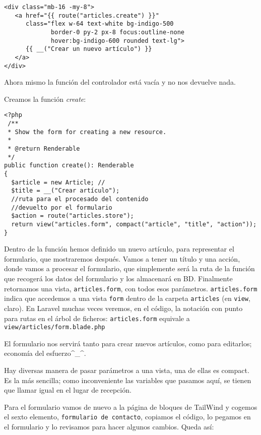 \documentclass[11pt]{article}
\begin{document}
\begin{verbatim}
<div class="mb-16 -my-8">
   <a href="{{ route("articles.create") }}"
      class="flex w-64 text-white bg-indigo-500
             border-0 py-2 px-8 focus:outline-none
             hover:bg-indigo-600 rounded text-lg">
      {{ __("Crear un nuevo artículo") }}
   </a>
</div>
\end{verbatim}
Ahora mismo la función del controlador está vacía y no nos devuelve nada.

Creamos la función \emph{create}:

\begin{verbatim}
<?php
 /**
 * Show the form for creating a new resource.
 *
 * @return Renderable
 */
public function create(): Renderable
{
  $article = new Article; //
  $title = __("Crear artículo");
  //ruta para el procesado del contenido
  //devuelto por el formulario
  $action = route("articles.store");
  return view("articles.form", compact("article", "title", "action"));
}
\end{verbatim}

Dentro de la función hemos definido un nuevo artículo, para
representar el formulario, que mostraremos después. Vamos a tener un
título y una acción, donde vamos a procesar el formulario, que
simplemente será la ruta de la función que recogerá los datos del
formulario y los almacenará en BD. Finalmente retornamos una vista,
\texttt{articles.form}, con todos esos parámetros. \texttt{articles.form} indica que
accedemos a una vista \texttt{form} dentro de la carpeta \texttt{articles} (en
\texttt{view}, claro). En Laravel muchas veces veremos, en el código, la
notación con punto para rutas en el árbol de ficheros:
\texttt{articles.form} equivale a \texttt{view/articles/form.blade.php}

El formulario nos servirá tanto para crear nuevos artículos, como para
editarlos; economía del esfuerzo\^{}\_\^{}.

Hay diversas manera de pasar parámetros a una vista, una de ellas es
compact. Es la más sencilla; como inconveniente las variables que
pasamos aquí, se tienen que llamar igual en el lugar de recepción.


Para el formulario vamos de nuevo a la página de bloques de TailWind y
cogemos el sexto elemento, \texttt{formulario de contacto}, copiamos el código,
lo pegamos en el formulario y lo revisamos para hacer algunos cambios.
Queda así:
\end{document}
